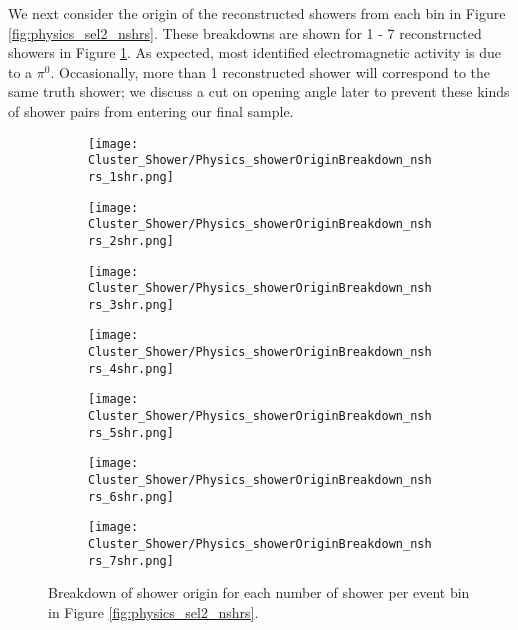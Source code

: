 \par We next consider the origin of the reconstructed showers from each bin in Figure \ref{fig:physics_sel2_nshrs}. These breakdowns are shown for 1 - 7 reconstructed showers in Figure \ref{fig:physics_sel2_nshr_background_breakdown}. As expected, most identified electromagnetic activity is due to a $\pi^0$. Occasionally, more than 1 reconstructed shower will correspond to the same truth shower; we discuss a cut on opening angle later to prevent these kinds of shower pairs from entering our final sample. 
\begin{figure}[H]
\centering
  \begin{subfigure}[t]{0.25\textwidth}
    \centering
\texttt{[image: Cluster\_Shower/Physics\_showerOriginBreakdown\_nshrs\_1shr.png]}
  \caption{ }
  \end{subfigure} 
  \hspace{4mm}
  \begin{subfigure}[t]{0.25\textwidth}
    \centering
\texttt{[image: Cluster\_Shower/Physics\_showerOriginBreakdown\_nshrs\_2shr.png]}
  \caption{ }
  \end{subfigure} 
  \hspace{4mm}
  \begin{subfigure}[t]{0.25\textwidth}
    \centering
\texttt{[image: Cluster\_Shower/Physics\_showerOriginBreakdown\_nshrs\_3shr.png]}
  \caption{ }
  \end{subfigure} 
  \hspace{4mm}
  \begin{subfigure}[t]{0.25\textwidth}
    \centering
\texttt{[image: Cluster\_Shower/Physics\_showerOriginBreakdown\_nshrs\_4shr.png]}
  \caption{ }
  \end{subfigure} 
  \hspace{4mm}
  \begin{subfigure}[t]{0.25\textwidth}
    \centering
\texttt{[image: Cluster\_Shower/Physics\_showerOriginBreakdown\_nshrs\_5shr.png]}
  \caption{ }
  \end{subfigure} 
  \hspace{4mm}
  \begin{subfigure}[t]{0.25\textwidth}
    \centering
\texttt{[image: Cluster\_Shower/Physics\_showerOriginBreakdown\_nshrs\_6shr.png]}
  \caption{ }
  \end{subfigure} 
  \hspace{4mm}
  \begin{subfigure}[t]{0.25\textwidth}
    \centering
\texttt{[image: Cluster\_Shower/Physics\_showerOriginBreakdown\_nshrs\_7shr.png]}
  \caption{ }
  \end{subfigure} 
\caption{ Breakdown of shower origin for each number of shower per event bin in Figure \ref{fig:physics_sel2_nshrs}. }
\label{fig:physics_sel2_nshr_background_breakdown}
\end{figure}


